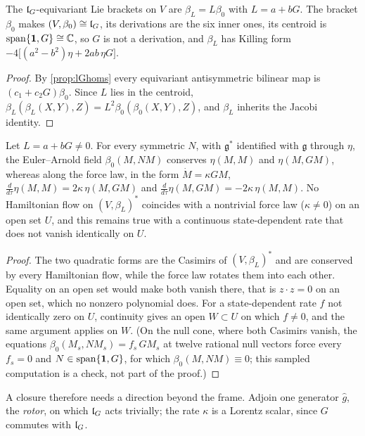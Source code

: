\begin{theorem}
\label{thm:brackets}
The $\mathfrak l_G$-equivariant Lie brackets on $V$ are $\beta_L=L\beta_0$ with $L=a+bG$. The bracket $\beta_0$ makes $(V,\beta_0)\cong\mathfrak l_G$, its derivations
are the six inner ones, its centroid is $\operatorname{span}\{\mathbf 1,G\}\cong\mathbb{C}$, so $G$ is not a derivation, and $\beta_L$ has Killing form
$-4\bigl[(a^2-b^2)\eta+2ab\,\eta G\bigr]$.
\end{theorem}

\begin{proof}
By \cref{prop:lGhoms} every equivariant antisymmetric bilinear map is $(c_1+c_2G)\beta_0$. Since $L$ lies in the centroid,
$\beta_L(\beta_L(X,Y),Z)=L^2\beta_0(\beta_0(X,Y),Z)$, and $\beta_L$ inherits the Jacobi identity.
\end{proof}

\begin{theorem}
\label{thm:noframe}
Let $L=a+bG\neq0$. For every symmetric $N$, with $\mathfrak g^*$ identified with $\mathfrak g$ through $\eta$, the Euler--Arnold field
$\beta_0(M,NM)$ conserves $\eta(M,M)$ and $\eta(M,GM)$, whereas along the force law, in the form $\dot M=\kappa GM$,
$\tfrac{d}{d\tau}\eta(M,M)=2\kappa\,\eta(M,GM)$ and $\tfrac{d}{d\tau}\eta(M,GM)=-2\kappa\,\eta(M,M)$. No Hamiltonian flow on $(V,\beta_L)^*$ coincides
with a nontrivial force law ($\kappa\neq0$) on an open set $U$, and this remains true with a continuous state-dependent rate that does not vanish
identically on $U$.
\end{theorem}

\begin{proof}
The two quadratic forms are the Casimirs of $(V,\beta_L)^*$ and are conserved by every Hamiltonian flow, while the force law rotates them into
each other. Equality on an open set would make both vanish there, that is $z\cdot z=0$ on an open set, which no nonzero polynomial does. For a
state-dependent rate $f$ not identically zero on $U$, continuity gives an open $W\subset U$ on which $f\neq0$, and the same argument applies on $W$.
(On the null cone, where both Casimirs vanish, the equations $\beta_0(M_s,NM_s)=f_s\,GM_s$ at twelve rational null vectors force every $f_s=0$ and
$N\in\operatorname{span}\{\mathbf 1,G\}$, for which $\beta_0(M,NM)\equiv0$; this sampled computation is a check, not part of the proof.)
\end{proof}

A closure therefore needs a direction beyond the frame. Adjoin one generator $\hat g$, the \emph{rotor}, on which $\mathfrak l_G$ acts trivially; the rate
$\kappa$ is a Lorentz scalar, since $G$ commutes with $\mathfrak l_G$.

